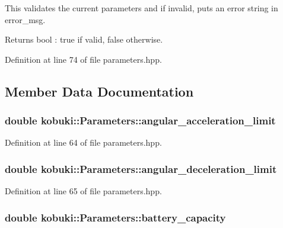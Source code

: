 \-This validates the current parameters and if invalid, puts an error string in error\-\_\-msg.

\begin{DoxyReturn}{\-Returns}
bool \-: true if valid, false otherwise. 
\end{DoxyReturn}


\-Definition at line 74 of file parameters.\-hpp.



\subsection{\-Member \-Data \-Documentation}
\subsubsection[{angular\-\_\-acceleration\-\_\-limit}]{\setlength{\rightskip}{0pt plus 5cm}double {\bf kobuki\-::\-Parameters\-::angular\-\_\-acceleration\-\_\-limit}}\label{classkobuki_1_1Parameters_a39945d15b7e6e73365546ec7cd1e0e38}


\-Definition at line 64 of file parameters.\-hpp.

\subsubsection[{angular\-\_\-deceleration\-\_\-limit}]{\setlength{\rightskip}{0pt plus 5cm}double {\bf kobuki\-::\-Parameters\-::angular\-\_\-deceleration\-\_\-limit}}\label{classkobuki_1_1Parameters_a2aa21b58334b3e115f0f583115c852a0}


\-Definition at line 65 of file parameters.\-hpp.

\subsubsection[{battery\-\_\-capacity}]{\setlength{\rightskip}{0pt plus 5cm}double {\bf kobuki\-::\-Parameters\-::battery\-\_\-capacity}}\label{classkobuki_1_1Parameters_a0c7b04175141d702f520c4a963876143}


